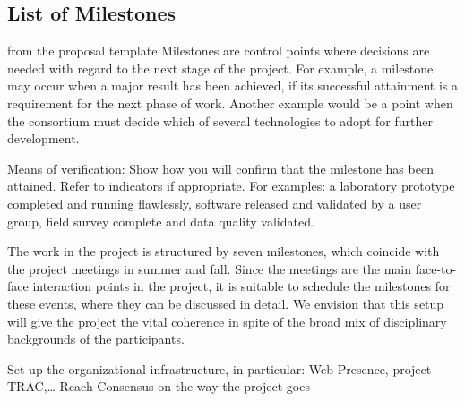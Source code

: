 \subsection{List of Milestones}\label{sec:milestones}

\begin{todo}{from the proposal template}
  Milestones are control points where decisions are needed with regard to the next stage
  of the project. For example, a milestone may occur when a major result has been
  achieved, if its successful attainment is a requirement for the next phase of
  work. Another example would be a point when the consortium must decide which of several
  technologies to adopt for further development.

  Means of verification: Show how you will confirm that the milestone has been
  attained. Refer to indicators if appropriate. For examples: a laboratory prototype
  completed and running flawlessly, software released and validated by a user group, field
  survey complete and data quality validated.
\end{todo}


The work in the {\pn} project is structured by seven milestones, which coincide with the
project meetings in summer and fall.  Since the meetings are the main face-to-face
interaction points in the project, it is suitable to schedule the milestones for these
events, where they can be discussed in detail. We envision that this setup will give the
project the vital coherence in spite of the broad mix of disciplinary backgrounds of the
participants.

\begin{milestones}
    {Set up the organizational infrastructure, in particular: Web Presence, project TRAC,\ldots}
   {Reach Consensus on the
    way the project goes}
\end{milestones}


